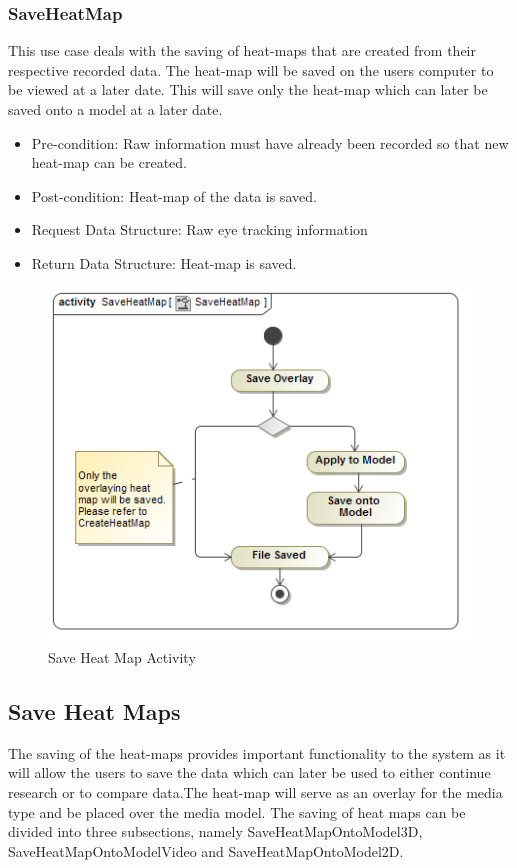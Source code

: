 	\subsubsection{SaveHeatMap}
	This use case deals with the saving of heat-maps that are created from their respective recorded data. The heat-map will be saved on the users computer to be viewed at a later date. This will save only the heat-map which can later be saved onto a model at a later date.
	\begin{itemize}
		\item Pre-condition: Raw information must have already been recorded so that new heat-map can be created.
		\item Post-condition: Heat-map of the data is saved.
		\item Request Data Structure: Raw eye tracking information
		\item Return Data Structure: Heat-map is saved.
	\end{itemize}
	
	\begin{figure}[!ht]
		\centering
		\includegraphics[scale=0.5,width=15cm,keepaspectratio]{Diagrams/Activity_Diagram__SaveHeatMap__SaveHeatMap.png}
		\caption{Save Heat Map Activity}
	\end{figure}
	
\subsection{Save Heat Maps}
	The saving of the heat-maps provides important functionality to the system as it will allow the users to save the data which can later be used to either continue research or to compare data.The heat-map will serve as an overlay for the media type and be placed over the media model. The saving of heat maps can be divided into three subsections, namely SaveHeatMapOntoModel3D, SaveHeatMapOntoModelVideo and SaveHeatMapOntoModel2D.
	\newline
	
